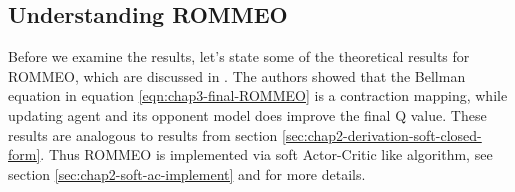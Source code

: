 \label{sec:chap3-ROMMEO-interpretation}

\subsection{Understanding ROMMEO}
Before we examine the results, let's state some of the theoretical results for ROMMEO, which are discussed in \cite{tian2019regularized}. The authors showed that the Bellman equation in equation \ref{eqn:chap3-final-ROMMEO} is a contraction mapping, while updating agent and its opponent model does improve the final Q value. These results are analogous to results from section \ref{sec:chap2-derivation-soft-closed-form}. Thus ROMMEO is implemented via soft Actor-Critic like algorithm, see section \ref{sec:chap2-soft-ac-implement} and \cite{tian2019regularized} for more details. 

